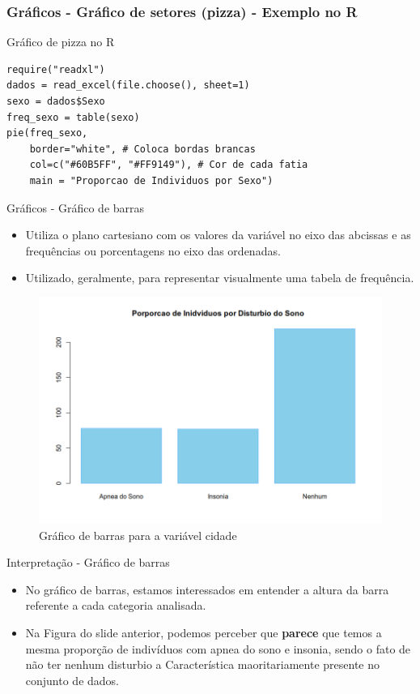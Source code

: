 \begin{frame}[fragile]
    \frametitle{Gráficos - Gráfico de setores (pizza) - Exemplo no R}
    
    \begin{block}{Gráfico de pizza no R}
    \begin{verbatim}
require("readxl")
dados = read_excel(file.choose(), sheet=1) 
sexo = dados$Sexo
freq_sexo = table(sexo)
pie(freq_sexo,
    border="white", # Coloca bordas brancas
    col=c("#60B5FF", "#FF9149"), # Cor de cada fatia
    main = "Proporcao de Individuos por Sexo")
\end{verbatim}
\end{block}
\end{frame}

\begin{frame}{Gráficos - Gráfico de barras}
\begin{itemize}
    \item Utiliza o plano cartesiano com os valores da variável no eixo das abcissas e as frequências ou porcentagens no eixo das ordenadas. 
    \pause
    \item Utilizado, geralmente, para representar visualmente uma tabela de frequência.
\end{itemize}

\pause
\begin{figure}
    \centering
    \includegraphics[width=0.8\linewidth]{figures/grafico_barras.png}
    \caption{Gráfico de barras para a variável cidade}
\end{figure}
\end{frame}

\begin{frame}{Interpretação - Gráfico de barras}

    \begin{itemize}
        \item No gráfico de barras, estamos interessados em entender a altura da barra referente a cada categoria analisada. 
        \pause
        \item Na Figura do slide anterior, podemos perceber que \textbf{parece} que temos a mesma proporção de indivíduos com apnea do sono e insonia, sendo 
        o fato de não ter nenhum disturbio a Característica maoritariamente presente no conjunto de dados. 
    \end{itemize}
\end{frame}


